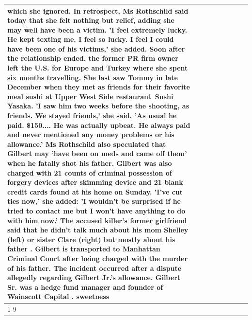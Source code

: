 \begin{table}[H]
\begin{tabular}{lllrlllll}
which she ignored. In retrospect, Ms Rothschild said today that she felt nothing but relief, adding she may well have been a victim. 'I feel extremely lucky. He kept texting me. I feel so lucky. I feel I could have been one of his victims,' she added. Soon after the relationship ended, the former PR firm owner left the U.S. for Europe and Turkey where she spent six months  travelling. She last saw Tommy in late December when they met as friends for their favorite meal sushi at Upper West Side restaurant Sushi Yasaka. 'I saw him two weeks before the shooting, as friends. We stayed friends,' she said. 'As usual he paid. \$150.... He was actually upbeat. He always paid and never mentioned any money problems or his allowance.' Ms Rothschild also speculated that Gilbert may 'have been on meds and came off them' when he fatally shot his father. Gilbert was also charged with 21 counts of criminal possession of forgery devices after skimming device and 21 blank credit cards found at his home on Sunday. 'I've cut ties now,' she added: 'I wouldn’t be surprised if he tried to contact me but I won’t have anything to do with him now.' The accused killer's former girlfriend said that he didn't talk much about his mom Shelley (left) or sister Clare (right) but mostly about his father . Gilbert is transported to Manhattan Criminal Court  after being charged with the murder of his father. The incident occurred after a dispute allegedly regarding Gilbert Jr.'s allowance. Gilbert Sr. was a hedge fund manager and founder of Wainscott Capital . sweetness \\
\cline{1-9} \cline{2-9}

\end{tabular}
\end{table}
